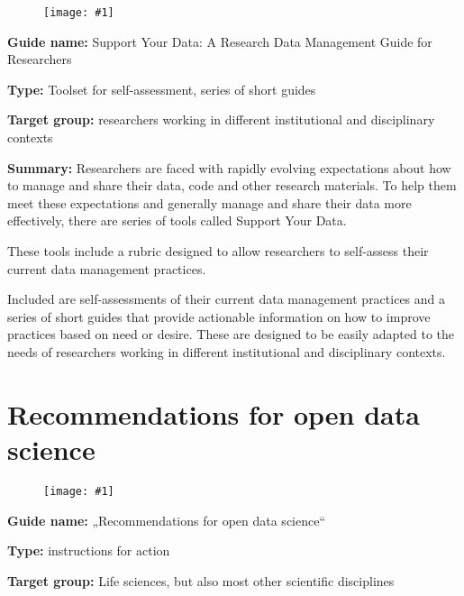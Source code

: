 \documentclass{article}
\newlength{\imgwidth}
\newcommand\scaledgraphics[2]{%
                
\settowidth{\imgwidth}{\texttt{[image: \#1]}}%
                
\setlength{\imgwidth}{\minof{\imgwidth}{#2\textwidth}}%
                
\texttt{[image: \#1]}%
                
}
\begin{document}
\begin{center}
\begin{figure}
\scaledgraphics{45bdf5de-7e5b-448d-820a-d3b3288a4dbe.png}{0.5}
\label{F88206441}
\end{figure}


\end{center}


\textbf{Guide name:} Support Your Data: A Research Data Management Guide for Researchers \autocite{borghi_support_2018}


\textbf{Type:} Toolset for self-assessment, series of short guides


\textbf{Target group:} researchers working in different institutional and disciplinary contexts


\textbf{Summary:} Researchers are faced with rapidly evolving expectations about how to manage and share their data, code and other research materials. To help them meet these expectations and generally manage and share their data more effectively, there are series of tools called Support Your Data.


These tools include a rubric designed to allow researchers to self-assess their current data management practices.


Included are self-assessments of their current data management practices and a series of short guides that provide actionable information on how to improve practices based on need or desire. These are designed to be easily adapted to the needs of researchers working in different institutional and disciplinary contexts.


\section{ Recommendations for open data science}\label{H2986141}





\begin{figure}
\scaledgraphics{10e3bc75-5c14-48e3-a161-d685105f455b.png}{1}
\label{F57414871}
\end{figure}





\textbf{Guide name:} „Recommendations for open data science“ \autocite{gymrek_recommendations_2016}


\textbf{Type:} instructions for action


\textbf{Target group:} Life sciences, but also most other scientific disciplines
\end{document}

